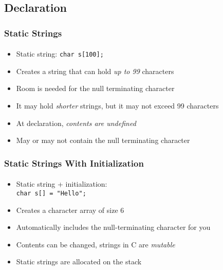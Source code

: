 \documentclass[]{beamer}
\begin{document}
\subsection{Declaration}

\begin{frame}[fragile]
    \frametitle{Static Strings}
    \framesubtitle{}

\begin{itemize}[<+->]
  \item Static string: \texttt{char s[100];}
  \item Creates a string that can hold \emph{up to 99} characters
  \item Room is needed for the null terminating character
  \item It may hold \emph{shorter} strings, but it may not exceed 99 characters
  \item At declaration, \emph{contents are undefined}
  \item May or may not contain the null terminating character
\end{itemize}
  
\end{frame}

\begin{frame}[fragile]
    \frametitle{Static Strings With Initialization}
    \framesubtitle{}

\begin{itemize}[<+->]
  \item Static string + initialization: \\
    \texttt{char s[] = "Hello";}
  \item Creates a character array of size 6
  \item Automatically includes the null-terminating character for you
  \item Contents can be changed, strings in C are \emph{mutable}
  \item Static strings are allocated on the stack
\end{itemize}
  
\end{frame}
\end{document}
